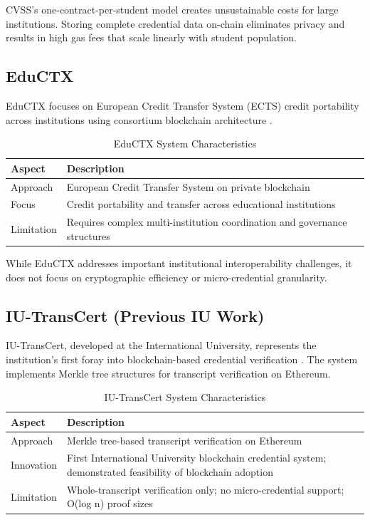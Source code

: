 CVSS's one-contract-per-student model creates unsustainable costs for large institutions. Storing complete credential data on-chain eliminates privacy and results in high gas fees that scale linearly with student population.

\subsection{EduCTX}
\label{subsec:eductx}

EduCTX focuses on European Credit Transfer System (ECTS) credit portability across institutions using consortium blockchain architecture \cite{turkanovic_eductx}.

\begin{table}[H]
\centering
\caption{EduCTX System Characteristics}
\label{tab:eductx}
\begin{tabular}{|p{3.5cm}|p{9.5cm}|}
\hline
\textbf{Aspect} & \textbf{Description} \\
\hline
Approach & European Credit Transfer System on private blockchain \\
\hline
Focus & Credit portability and transfer across educational institutions \\
\hline
Limitation & Requires complex multi-institution coordination and governance structures \\
\hline
\end{tabular}
\end{table}

While EduCTX addresses important institutional interoperability challenges, it does not focus on cryptographic efficiency or micro-credential granularity.

\subsection{IU-TransCert (Previous IU Work)}
\label{subsec:iutranscert}

IU-TransCert, developed at the International University, represents the institution's first foray into blockchain-based credential verification \cite{le_iutranscert}. The system implements Merkle tree structures for transcript verification on Ethereum.

\begin{table}[H]
\centering
\caption{IU-TransCert System Characteristics}
\label{tab:iutranscert}
\begin{tabular}{|p{3.5cm}|p{9.5cm}|}
\hline
\textbf{Aspect} & \textbf{Description} \\
\hline
Approach & Merkle tree-based transcript verification on Ethereum \\
\hline
Innovation & First International University blockchain credential system; demonstrated feasibility of blockchain adoption \\
\hline
Limitation & Whole-transcript verification only; no micro-credential support; O(log n) proof sizes \\
\hline
\end{tabular}
\end{table}

